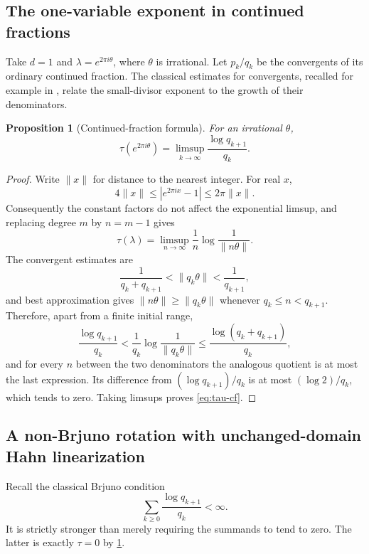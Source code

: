 \documentclass[11pt,letterpaper]{article}
\newtheorem{proposition}[proposition]{Proposition}
\theoremstyle{definition}
\theoremstyle{remark}
\numberwithin{equation}{section}
\begin{document}
\subsection{The one-variable exponent in continued fractions}
Take $d=1$ and $\lambda=e^{2\pi i\theta}$, where $\theta$ is irrational.
Let $p_k/q_k$ be the convergents of its ordinary continued fraction. The
classical estimates for convergents, recalled for example in
\cite[Appendix A]{CarlettiMarmi}, relate the small-divisor exponent to the
growth of their denominators.

\begin{proposition}[Continued-fraction formula]\label{prop:cf}
For an irrational $\theta$,
\begin{equation}\label{eq:tau-cf}
 \tau(e^{2\pi i\theta})=
 \limsup_{k\to\infty}\frac{\log q_{k+1}}{q_k}.
\end{equation}
\end{proposition}
\begin{proof}
Write $\|x\|$ for distance to the nearest integer. For real $x$,
\[
 4\|x\|\le |e^{2\pi ix}-1|\le2\pi\|x\|.
\]
Consequently the constant factors do not affect the exponential limsup, and
replacing degree $m$ by $n=m-1$ gives
\[
 \tau(\lambda)=\limsup_{n\to\infty}
                  \frac1n\log\frac1{\|n\theta\|}.
\]
The convergent estimates are
\[
 \frac1{q_k+q_{k+1}}<\|q_k\theta\|<\frac1{q_{k+1}},
\]
and best approximation gives
$\|n\theta\|\ge\|q_k\theta\|$ whenever
$q_k\le n<q_{k+1}$. Therefore, apart from a finite initial range,
\[
 \frac{\log q_{k+1}}{q_k}
 <\frac1{q_k}\log\frac1{\|q_k\theta\|}
 \le\frac{\log(q_k+q_{k+1})}{q_k},
\]
and for every $n$ between the two denominators the analogous quotient is
at most the last expression. Its difference from
$(\log q_{k+1})/q_k$ is at most $(\log2)/q_k$, which tends to zero.
Taking limsups proves \eqref{eq:tau-cf}.
\end{proof}

\subsection{A non-Brjuno rotation with unchanged-domain Hahn linearization}
Recall the classical Brjuno condition
\begin{equation}\label{eq:Brjuno}
 \sum_{k\ge0}\frac{\log q_{k+1}}{q_k}<\infty.
\end{equation}
It is strictly stronger than merely requiring the summands to tend to zero.
The latter is exactly $\tau=0$ by \cref{prop:cf}.
\end{document}
